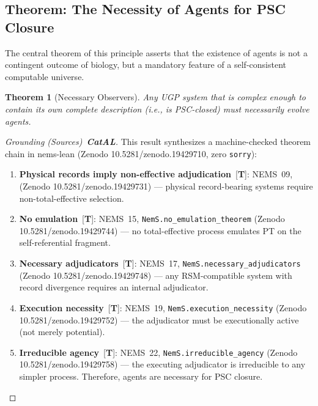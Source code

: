 \documentclass[12pt]{article}
\newtheorem{theorem}{Theorem}[section]
\begin{document}
\subsection{Theorem: The Necessity of Agents for PSC Closure}
The central theorem of this principle asserts that the existence of agents is not a contingent outcome of biology, but a mandatory feature of a self-consistent computable universe.

\begin{theorem}[Necessary Observers]
\label{thm:necessary_observers}
Any UGP system that is complex enough to contain its own complete description (i.e., is PSC-closed) must necessarily evolve agents.
\end{theorem}
\begin{proof}[Grounding (Sources)~\textbf{CatAL}]
This result synthesizes a machine-checked theorem chain in nems-lean
(Zenodo 10.5281/\allowbreak zenodo.19429710, zero \texttt{sorry}):
\begin{enumerate}[leftmargin=*, itemsep=0.2em]
    \item \textbf{Physical records imply non-effective adjudication}~[\textbf{T}]:
    NEMS~09, 
    (Zenodo 10.5281/\allowbreak zenodo.19429731) --- physical record-bearing systems require
    non-total-effective selection.
    \item \textbf{No emulation}~[\textbf{T}]: NEMS~15,
    \texttt{NemS.no\_emulation\_theorem}
    (Zenodo 10.5281/zenodo.19429744) --- no total-effective process emulates PT
    on the self-referential fragment.
    \item \textbf{Necessary adjudicators}~[\textbf{T}]: NEMS~17,
    \texttt{NemS.necessary\_adjudicators}
    (Zenodo 10.5281/zenodo.19429748) --- any RSM-compatible system with record
    divergence requires an internal adjudicator.
    \item \textbf{Execution necessity}~[\textbf{T}]: NEMS~19,
    \texttt{NemS.execution\_necessity}
    (Zenodo 10.5281/zenodo.19429752) --- the adjudicator must be executionally
    active (not merely potential).
    \item \textbf{Irreducible agency}~[\textbf{T}]: NEMS~22,
    \texttt{NemS.irreducible\_agency}
    (Zenodo 10.5281/zenodo.19429758) --- the executing adjudicator is irreducible
    to any simpler process. Therefore, agents are necessary for PSC closure.
    \qedhere
\end{enumerate}
\end{proof}
\end{document}

